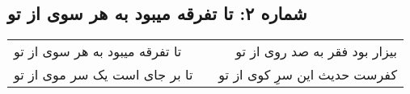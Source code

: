 \begin{center}
\section*{شماره ۲: تا تفرقه میبود به هر سوی از تو}
\label{sec:002}
\begin{longtable}{l p{0.5cm} r}
تا تفرقه میبود به هر سوی از تو
&&
بیزار بود فقر به صد روی از تو
\\
تا بر جای است یک سر موی از تو
&&
کفرست حدیث این سرِ کوی از تو
\\
\end{longtable}
\end{center}
